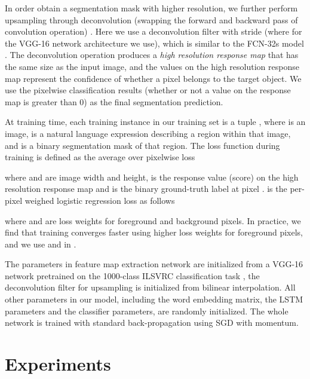 \documentclass[runningheads]{llncs}
\begin{document}
In order obtain a segmentation mask with higher resolution, we further perform upsampling through deconvolution (swapping the forward and backward pass of convolution operation) \cite{long2015fully,noh2015learning}. Here we use a  deconvolution filter with stride  (where  for the VGG-16 network architecture we use), which is similar to the FCN-32s model \cite{long2015fully}. The deconvolution operation produces a  \textit{high resolution response map} that has the same size as the input image, and the values on the high resolution response map represent the confidence of whether a pixel belongs to the target object. We use the pixelwise classification results (\ie whether or not a value on the response map is greater than 0) as the final segmentation prediction.

At training time, each training instance in our training set is a tuple , where  is an image,  is a natural language expression describing a region within that image, and  is a binary segmentation mask of that region. The loss function during training is defined as the average over pixelwise loss

where  and  are image width and height,  is the response value (score) on the high resolution response map and  is the binary ground-truth label at pixel .  is the per-pixel weighed logistic regression loss as follows

where  and  are loss weights for foreground and background pixels. In practice, we find that training converges faster using higher loss weights for foreground pixels, and we use  and  in .

The parameters in feature map extraction network are initialized from a VGG-16 network \cite{simonyan2014very} pretrained on the 1000-class ILSVRC classification task \cite{russakovsky2015imagenet}, the deconvolution filter for upsampling is initialized from bilinear interpolation. All other parameters in our model, including the word embedding matrix, the LSTM parameters and the classifier parameters, are randomly initialized. The whole network is trained with standard back-propagation using SGD with momentum.

\section{Experiments}\label{sec:exp-referit}
\end{document}
